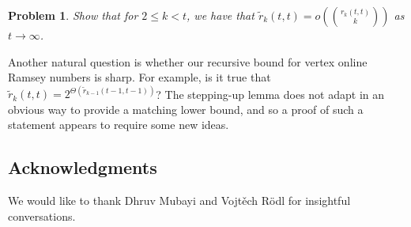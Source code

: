 \documentclass[A4paper,reqno,oneside,12pt]{amsart}
\theoremstyle{plain}
\newtheorem{problem}[theorem]{Problem}
\theoremstyle{definition}
\begin{document}
\begin{problem}
    Show that for $2 \leq k < t$, we have that $\tilde{r}_k(t,t) = o\left(\binom{r_k(t,t)}{k}\right)$ as $t \to \infty$.
\end{problem}

Another natural question is whether our recursive bound for vertex online Ramsey numbers is sharp.
For example, is it true that $\tilde{r}_k(t,t) = 2^{\Theta(\tilde{r}_{k-1}(t-1,t-1))}$?
The stepping-up lemma does not adapt in an obvious way to provide a matching lower bound, and so a proof of such a statement appears to require some new ideas.

\subsection*{Acknowledgments}
We would like to thank Dhruv Mubayi and Vojt\v{e}ch R\"odl for insightful conversations.

\end{document}

